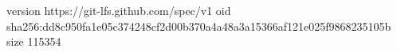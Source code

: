 version https://git-lfs.github.com/spec/v1
oid sha256:dd8c950fa1e05c374248cf2d00b370a4a48a3a15366af121e025f9868235105b
size 115354
